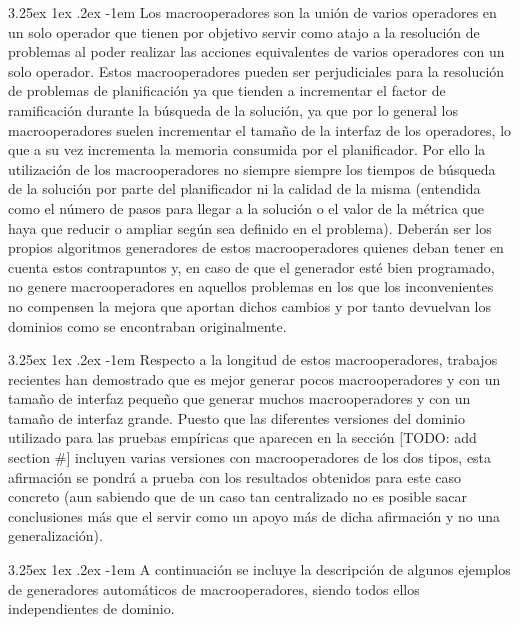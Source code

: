 \documentclass{article}
\makeatletter
\renewcommand\paragraph{\@startsection{paragraph}{5}{\z@}%
  {3.25ex \@plus1ex \@minus.2ex}%
  {-1em}%
  {\normalfont\normalsize\bfseries}}
\makeatother
\begin{document}
\paragraph{}
Los macrooperadores son la unión de varios operadores en un solo operador que tienen por objetivo servir como atajo a la resolución de problemas al poder realizar las acciones equivalentes de varios operadores con un solo operador. Estos macrooperadores pueden ser perjudiciales para la resolución de problemas de planificación ya que tienden a incrementar el factor de ramificación durante la búsqueda de la solución, ya que por lo general los macrooperadores suelen incrementar el tamaño de la interfaz de los operadores, lo que a su vez incrementa la memoria consumida por el planificador. Por ello la utilización de los macrooperadores no siempre siempre los tiempos de búsqueda de la solución por parte del planificador ni la calidad de la misma (entendida como el número de pasos para llegar a la solución o el valor de la métrica que haya que reducir o ampliar según sea definido en el problema). Deberán ser los propios algoritmos generadores de estos macrooperadores quienes deban tener en cuenta estos contrapuntos y, en caso de que el generador esté bien programado, no genere macrooperadores en aquellos problemas en los que los inconvenientes no compensen la mejora que aportan dichos cambios y por tanto devuelvan los dominios como se encontraban originalmente.

\paragraph{}
Respecto a la longitud de estos macrooperadores, trabajos recientes han demostrado que es mejor generar pocos macrooperadores y con un tamaño de interfaz pequeño que generar muchos macrooperadores y con un tamaño de interfaz grande. Puesto que las diferentes versiones del dominio utilizado para las pruebas empíricas que aparecen en la sección [TODO: add section #] incluyen varias versiones con macrooperadores de los dos tipos, esta afirmación se pondrá a prueba con los resultados obtenidos para este caso concreto (aun sabiendo que de un caso tan centralizado no es posible sacar conclusiones más que el servir como un apoyo más de dicha afirmación y no una generalización).

\paragraph{}
A continuación se incluye la descripción de algunos ejemplos de generadores automáticos de macrooperadores, siendo todos ellos independientes de dominio.
\end{document}
